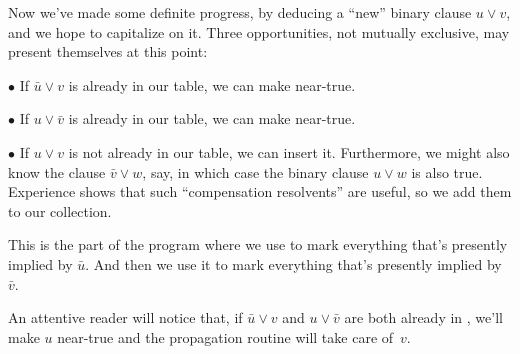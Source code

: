 Now we've made some definite progress, by deducing a ``new'' binary
clause $u\lor v$, and we hope to capitalize on it. Three
opportunities, not mutually exclusive, may present themselves at this point:
\smallskip
\item{$\bullet$}
If $\bar u\lor v$ is already in our  table, we can make 
near-true.
\smallskip
\item{$\bullet$}
If $u\lor\bar v$ is already in our  table, we can make 
near-true.
\smallskip
\item{$\bullet$}
If $u\lor v$ is not already in our  table, we can insert it.
\smallskip\noindent
Furthermore, we might also know the clause $\bar v\lor w$, say, in which case
the binary clause $u\lor w$ is also true. Experience shows that such
``compensation resolvents'' are useful, so we add them to our 
collection.

This is the part of the program where we use  to mark everything
that's presently implied by $\bar u$. And then we use it to mark everything
that's presently implied by $\bar v$.

An attentive reader will notice that, if $\bar u\lor v$ and $u\lor\bar v$
are both already in , we'll make $u$ near-true and the propagation
routine will take care of~$v$.

